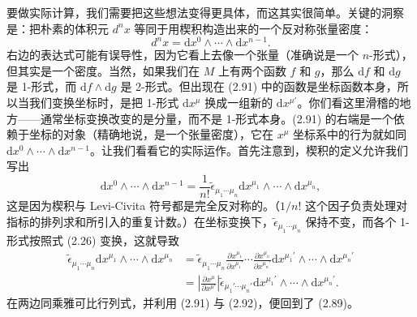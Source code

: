 要做实际计算，我们需要把这些想法变得更具体，而这其实很简单。关键的洞察是：把朴素的体积元 $d^{n}x$ 等同于用楔积构造出来的一个反对称张量密度：
\begin{equation*}
d^{n}x=\mathrm{d}x^{0}\wedge\cdots\wedge\mathrm{d}x^{n-1}. \tag{2.91}
\end{equation*}
右边的表达式可能有误导性，因为它看上去像一个张量（准确说是一个 $n$-形式），但其实是一个密度。当然，如果我们在 $M$ 上有两个函数 $f$ 和 $g$，那么 $\mathrm{d}f$ 和 $\mathrm{d}g$ 是 1-形式，而 $\mathrm{d}f\wedge\mathrm{d}g$ 是 2-形式。但出现在 (2.91) 中的函数是坐标函数本身，所以当我们变换坐标时，是把 1-形式 $\mathrm{d}x^{\mu}$ 换成一组新的 $\mathrm{d}x^{\mu'}$。你们看这里滑稽的地方——通常坐标变换改变的是分量，而不是 1-形式本身。(2.91) 的右端是一个依赖于坐标的对象（精确地说，是一个张量密度），它在 $x^{\mu}$ 坐标系中的行为就如同 $\mathrm{d}x^{0}\wedge\cdots\wedge\mathrm{d}x^{n-1}$。让我们看看它的实际运作。首先注意到，楔积的定义允许我们写出
\begin{equation*}
\mathrm{d}x^{0}\wedge\cdots\wedge\mathrm{d}x^{n-1}=\frac{1}{n!}\tilde{\epsilon}_{\mu_{1}\cdots\mu_{n}}\mathrm{d}x^{\mu_{1}}\wedge\cdots\wedge\mathrm{d}x^{\mu_{n}}, \tag{2.92}
\end{equation*}
这是因为楔积与 Levi-Civita 符号都是完全反对称的。（$1/n!$ 这个因子负责处理对指标的排列求和所引入的重复计数。）在坐标变换下，$\tilde{\epsilon}_{\mu_{1}\cdots\mu_{n}}$ 保持不变，而各个 1-形式按照式 (2.26) 变换，这就导致
\begin{align*}
\tilde{\epsilon}_{\mu_{1}\cdots\mu_{n}}\mathrm{d}x^{\mu_{1}}\wedge\cdots\wedge\mathrm{d}x^{\mu_{n}}&=\tilde{\epsilon}_{\mu_{1}\cdots\mu_{n}}\frac{\partial x^{\mu_{1}}}{\partial x^{\mu_{1}'}}\cdots\frac{\partial x^{\mu_{n}}}{\partial x^{\mu_{n}'}}\mathrm{d}x^{\mu_{1}'}\wedge\cdots\wedge\mathrm{d}x^{\mu_{n}'}\\
&=\left|\frac{\partial x^{\mu}}{\partial x^{\mu'}}\right|\tilde{\epsilon}_{\mu_{1}'\cdots\mu_{n}'}\mathrm{d}x^{\mu_{1}'}\wedge\cdots\wedge\mathrm{d}x^{\mu_{n}'}. \tag{2.93}
\end{align*}
在两边同乘雅可比行列式，并利用 (2.91) 与 (2.92)，便回到了 (2.89)。

